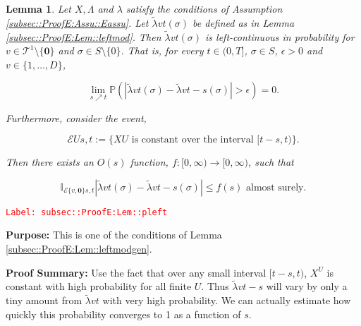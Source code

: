 \documentclass[12pt]{article}
\newcommand{\mb}{\mathbb}
\newcommand{\mc}{\mathcal}
\newcommand{\ra}{\rightarrow}
\newcommand{\te}{\text}
\newcommand{\ep}{\epsilon}
\newcommand{\tr}{\textcolor{red}}
\newcommand{\labe}[1]{\tr{\texttt{Label: #1}}}
\newcommand{\purpose}{\textbf{Purpose: }}
\newcommand{\pfsum}{\textbf{Proof Summary: }}
\newcommand{\pr}{\mb{P}}							%
\renewcommand{\root}{\mathbf{0}}				%
\renewcommand{\v}{v}							%
\renewcommand{\U}{U}							%
\renewcommand{\S}{S}							%
\newcommand{\s}{\sigma}							%
\newcommand{\T}{T}								%
\renewcommand{\t}{t}							%
\renewcommand{\tt}{s}							%
\newcommand{\X}{X}								%
\newcommand{\degr}{D}							%
\newcommand{\tree}{\mc{T}}						%
\newcommand{\sln}[1]{^{#1}}						%
\newcommand{\rate}{\lambda}						%
\newcommand{\alt}[1]{\widetilde{#1}}			%
\newcommand{\evnt}{\mc{E}}						%
\newcommand{\ratee}{\Lambda}					%
\newcommand{\crate}{\alt{\lambda}}				%
\newtheorem{lem}[thms]{Lemma}
\begin{document}
\begin{lem}
Let \(\X{}{},\ratee{}{}\) and \(\rate{}\) satisfy the conditions of Assumption \ref{subsec::ProofE:Assu::Eassu}. Let \(\crate{\v}{\t}(\s)\) be defined as in Lemma \ref{subsec::ProofE:Lem::leftmod}. Then \(\crate{\v}{\t}(\s)\) is left-continuous in probability for \(\v \in \tree\sln{1}\setminus\{\root\}\) and \(\s \in \S\setminus\{0\}\). That is, for every \(\t \in (0,\T]\), \(\s \in \S\), \(\ep > 0\) and \(\v\in \{1,\dots,\degr\}\),

\[\lim_{\tt \nearrow \t}\pr\left(|\crate{\v}{\t}(\s)- \crate{\v}{\t-\tt}(\s)| > \ep\right) = 0.\]

Furthermore, consider the event,

\[\evnt{\U}{\tt,\t} := \{\X{\U}{} \te{ is constant over the interval } [\t-\tt,\t)\}.\]

Then there exists an \(O(\tt)\) function, \(f:[0,\infty)\ra[0,\infty)\), such that 

\[\mb{I}_{\evnt{\{\v,\root\}}{\tt,\t}}|\crate{\v}{\t}(\s) - \crate{\v}{\t-\tt}(\s)| \leq f(\tt) \te{ almost surely.}\]
\label{subsec::ProofE:Lem::pleft}
\end{lem}
\labe{subsec::ProofE:Lem::pleft}

\purpose This is one of the conditions of Lemma \ref{subsec::ProofE:Lem::leftmodgen}.

\pfsum Use the fact that over any small interval \([\t-\tt,\t)\), \(X^U\) is constant with high probability for all finite \(U\). Thus \(\crate{v}{\t-\tt}\) will vary by only a tiny amount from \(\crate{v}{\t}\) with very high probability. We can actually estimate how quickly this probability converges to 1 as a function of \(s\).
\end{document}
